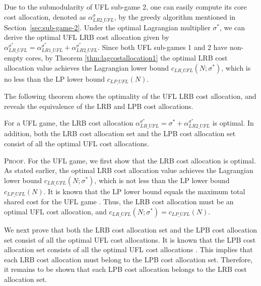 Due to the submodularity of UFL sub-game 2, one can easily compute its core cost allocation, denoted as $\alpha_{LR2\_UFL}^{\sigma}$, by the greedy algorithm mentioned in Section~\ref{sec:sub-game-2}. Under the optimal Lagrangian multiplier $\sigma^*$, we can derive the optimal UFL LRB cost allocation given by $\alpha_{LR\_UFL}^{\sigma^*} = \alpha_{LR1\_UFL}^{\sigma^*} + \alpha_{LR2\_UFL}^{\sigma^*}$.
Since both UFL sub-games 1 and 2 have non-empty cores, by Theorem \ref{thm:lagcostallocation1} the optimal LRB cost allocation value achieves the Lagrangian lower bound $c_{LR\_UFL}(N;\sigma^*)$,
which is no less than the LP lower bound $c_{LP\_UFL}(N)$.

The following theorem shows the optimality of the UFL LRB cost allocation, and reveals the equivalence of the LRB and LPB cost allocations.


\begin{theorem}\label{lemma:lpbequallrbufl}
For a UFL game, the LRB cost allocation $\alpha_{LR\_UFL}^{\sigma^*} = \sigma^* + \alpha_{LR2\_UFL}^{\sigma^*}$ is optimal. In addition, both the LRB cost allocation set and the LPB cost allocation set consist of all the optimal UFL cost allocations.
\end{theorem}
{\scshape Proof.}
For the UFL game, we first show that the LRB cost allocation is optimal. As stated earlier, the optimal LRB cost allocation value achieves the Lagrangian lower bound $c_{LR\_UFL}(N;\sigma^*)$, which is not less than the LP lower bound $c_{LP\_UFL}(N)$. It is known that the LP lower bound equals the maximum total shared cost for the UFL game \citep{Kolen1983FacilityLocationGame,Goemans2000FacilityLocationGames}. Thus, the LRB cost allocation must be an optimal UFL cost allocation, and $c_{LR\_UFL}(N;\sigma^*)=c_{LP\_UFL}(N)$.

We next prove that both the LRB cost allocation set and the LPB cost allocation set consist of all the optimal UFL cost allocations. It is known that the LPB cost allocation set consists of all the optimal UFL cost allocations \citep{Goemans2000FacilityLocationGames}. This implies that each LRB cost allocation must belong to the LPB cost allocation set. Therefore, it remains to be shown that each LPB cost allocation belongs to the LRB cost allocation set.

